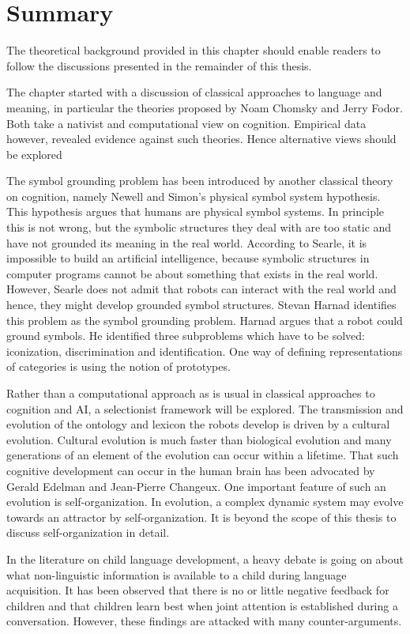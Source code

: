 \section{Summary}

The theoretical background provided in this chapter should enable readers to follow the discussions presented in the remainder of this thesis. 

\p
The chapter started with a discussion of classical approaches to language and meaning, in particular the theories proposed by Noam Chomsky and Jerry Fodor. Both take a nativist and computational view on cognition. Empirical data however, revealed evidence against such theories. Hence alternative views should be explored

The symbol grounding problem has been introduced by another classical theory on cognition, namely Newell and Simon's physical symbol system hypothesis. This hypothesis argues that humans are physical symbol systems. In principle this is not wrong, but the symbolic structures they deal with are too static and have not grounded its meaning in the real world. According to Searle, it is impossible to build an artificial intelligence, because symbolic structures in computer programs cannot be about something that exists in the real world. However, Searle does not admit that robots can interact with the real world and hence, they might develop grounded symbol structures. Stevan Harnad identifies this problem as the symbol grounding problem. Harnad argues that a robot could ground symbols. He identified three subproblems which have to be solved: iconization, discrimination and identification. One way of defining representations of categories is using the notion of prototypes. 

Rather than a computational approach as is usual in classical approaches to cognition and AI, a selectionist framework will be explored. The transmission and evolution of the ontology and lexicon the robots develop is driven by a cultural evolution. Cultural evolution is much faster than biological evolution and many generations of an element of the evolution can occur within a lifetime. That such cognitive development can occur in the human brain has been advocated by Gerald Edelman and Jean-Pierre Changeux. One important feature of such an evolution is self-organization. In evolution, a complex dynamic system may evolve towards an attractor by self-organization. It is beyond the scope of this thesis to discuss self-organization in detail.

In the literature on child language development, a heavy debate is going on about what non-linguistic information is available to a child during language acquisition. It has been observed that there is no or little negative feedback for children and that children learn best when joint attention is established during a conversation. However, these findings are attacked with many counter-arguments.

